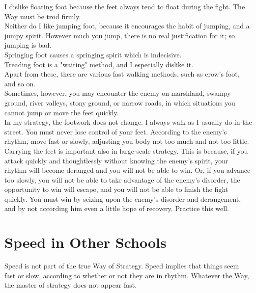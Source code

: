 I dislike floating foot because the feet always tend to float during the fight. The Way must be trod firmly.\\

Neither do I like jumping foot, because it encourages the habit of jumping, and a jumpy spirit. However much you jump, there is no real justification for it; so jumping is bad.\\

Springing foot causes a springing spirit which is indecisive.\\

Treading foot is a "waiting" method, and I especially dislike it.\\

Apart from these, there are various fast walking methods, such as crow's foot, and so on.\\

Sometimes, however, you may encounter the enemy on marshland, swampy ground, river valleys, stony ground, or narrow roads, in which situations you cannot jump or move the feet quickly.\\

In my strategy, the footwork does not change. I always walk as I usually do in the street. You must never lose control of your feet. According to the enemy's rhythm, move fast or slowly, adjusting you body not too much and not too little.\\

Carrying the feet is important also in large-scale strategy. This is because, if you attack quickly and thoughtlessly without knowing the enemy's spirit, your rhythm will become deranged and you will not be able to win. Or, if you advance too slowly, you will not be able to take advantage of the enemy's disorder, the opportunity to win will escape, and you will not be able to finish the fight quickly. You must win by seizing upon the enemy's disorder and derangement, and by not according him even a little hope of recovery. Practice this well.\\
\section{Speed in Other Schools}

Speed is not part of the true Way of Strategy. Speed implies that things seem fast or slow, according to whether or not they are in rhythm. Whatever the Way, the master of strategy does not appear fast.\\

